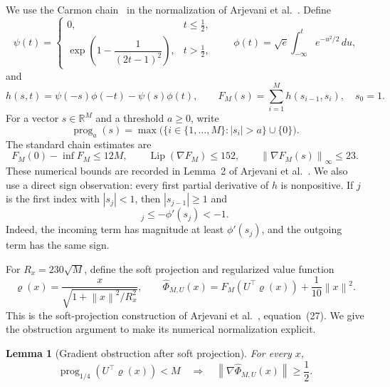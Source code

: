 \documentclass[11pt,a4paper]{article}
\newcommand{\R}{\mathbb R}
\newcommand{\norm}[1]{\left\lVert #1\right\rVert}
\newcommand{\prog}{\operatorname{prog}}
\newcommand{\Lip}{\operatorname{Lip}}
\newtheorem{lemma}[theorem]{Lemma}
\theoremstyle{definition}
\theoremstyle{remark}
\numberwithin{equation}{section}
\begin{document}
We use the Carmon chain~\cite{carmon} in the normalization of
Arjevani et al.~\cite{arjevani}. Define
\[
 \psi(t)=
 \begin{cases}
 0,&t\le\frac12,\\
 \exp\!\left(1-\dfrac1{(2t-1)^2}\right),&t>\frac12,
 \end{cases}
 \qquad
 \phi(t)=\sqrt e\int_{-\infty}^t e^{-u^2/2}\,du,
\]
and
\begin{equation}
 h(s,t)=\psi(-s)\phi(-t)-\psi(s)\phi(t),\qquad
 F_M(s)=\sum_{i=1}^M h(s_{i-1},s_i),\quad s_0=1.
 \label{eq:outer-chain}
\end{equation}
For a vector $s\in\R^M$ and a threshold $a\ge0$, write
\[
 \prog_a(s)=\max\bigl(\{i\in\{1,\ldots,M\}:|s_i|>a\}\cup\{0\}\bigr).
\]
The standard chain estimates are
\begin{equation}
 F_M(0)-\inf F_M\le12M,\qquad
 \Lip(\nabla F_M)\le152,\qquad
 \norm{\nabla F_M(s)}_\infty\le23.
 \label{eq:carmon-basic}
\end{equation}
These numerical bounds are recorded in Lemma~2 of
Arjevani et al.~\cite{arjevani}. We also use a direct sign observation:
every first partial derivative of $h$ is nonpositive. If $j$ is the
first index with $|s_j|<1$, then $|s_{j-1}|\ge1$ and
\begin{equation}
 [\nabla F_M(s)]_j\le-\phi'(s_j)<-1.
 \label{eq:outer-sign}
\end{equation}
Indeed, the incoming term has magnitude at least $\phi'(s_j)$, and
the outgoing term has the same sign.

For $R_x=230\sqrt M$, define the soft projection and regularized value
function
\begin{equation}
 \varrho(x)=\frac{x}{\sqrt{1+\norm{x}^2/R_x^2}},\qquad
 \widehat\Phi_{M,U}(x)=F_M(U^\top\varrho(x))+
                           \frac1{10}\norm x^2.
 \label{eq:outer-soft}
\end{equation}
This is the soft-projection construction of
Arjevani et al.~\cite{arjevani}, equation~(27). We give the obstruction
argument to make its numerical normalization explicit.

\begin{lemma}[Gradient obstruction after soft projection]
\label{lem:soft-projection}
For every $x$,
\begin{equation}
 \prog_{1/4}(U^\top\varrho(x))<M
 \quad\Longrightarrow\quad
 \norm{\nabla\widehat\Phi_{M,U}(x)}\ge\frac12.
 \label{eq:soft-obstruction}
\end{equation}
\end{lemma}
\end{document}
